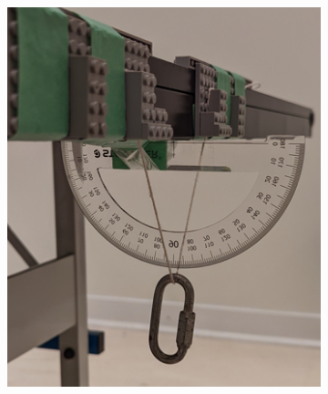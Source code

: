 \documentclass[12pt]{article}
\begin{document}
\begin{figure}[!hptb]
    \centering
    \begin{subfigure}{0.49\textwidth}
        \centering
        \includegraphics[width=\textwidth]{../figures/exp_setup3_angle.png}
    \end{subfigure}
    \hfill
    \begin{subfigure}{0.49\textwidth}
        \centering

\end{subfigure}
\end{figure}
\end{document}
